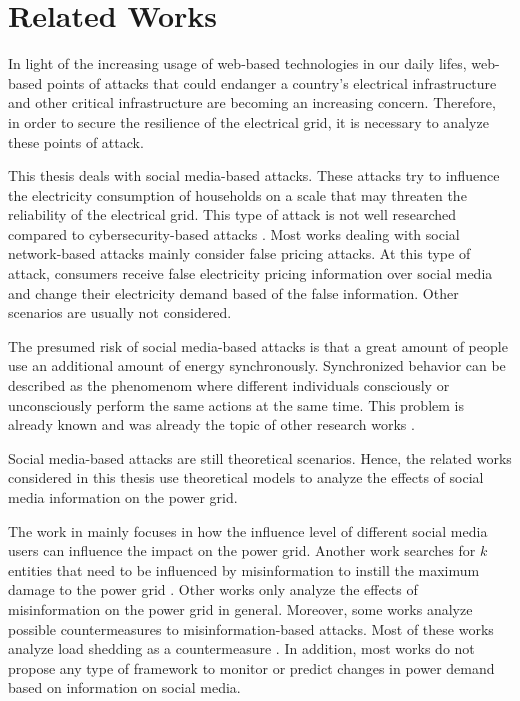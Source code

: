 \chapter{Related Works}
\label{relatedworks}
In light of the increasing usage of web-based technologies in our daily 
lifes, web-based points of attacks that could endanger a country's 
electrical infrastructure and other critical infrastructure 
are becoming an increasing concern.
Therefore, in order to secure the resilience of the electrical grid,
it is necessary to analyze these points of attack.

This thesis deals with social media-based
attacks. These attacks try to 
influence the electricity consumption of households 
on a scale that may threaten the reliability
of the electrical grid. 
This type of attack is not well researched compared to
cybersecurity-based attacks
\cite{sun2018cyber}. 
Most works dealing with social network-based
attacks mainly consider false pricing attacks. At this type of attack, 
consumers receive false 
electricity pricing information over social media and change their 
electricity demand based of the false information.
Other scenarios are usually not considered.

The presumed risk of social media-based attacks is that a 
great amount of people
use an additional amount of energy synchronously.
Synchronized behavior can be described 
as the phenomenom where different individuals
consciously or unconsciously
perform the same actions at the same time.
This problem is already known and was
already the topic of other research works
\cite{lei2014impact} \cite{walker2014dynamics}
\cite{gebhard2022monitoring}.

Social media-based attacks are still theoretical scenarios.
Hence, the related works considered in this thesis use theoretical
models to analyze the effects of social media information
on the power grid.

The work in \cite{vulnerabilityanalysis} mainly focuses in how the influence 
level of different social media users can influence the 
impact on the power grid. Another work
searches for $k$ entities that
need to be influenced by misinformation to instill 
the maximum damage to the power grid \cite{pan2017threat}.
Other works only analyze the 
effects of misinformation on the power grid
in general.
Moreover, some works analyze possible countermeasures to misinformation-based
attacks. Most of these works analyze load shedding as a 
countermeasure \cite{pan2017threat} \cite{nguyen2019vulnerability}.
In addition, most works do not propose any type of framework to 
monitor or predict changes in power demand based on 
information on social media.

